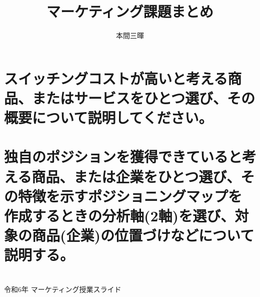 \documentclass[titlepage,a4paper]{jsarticle}
\title{マーケティング\ajRoman{2}課題まとめ}
\author{本間三暉}
\begin{document}
\maketitle
\section{スイッチングコストが高いと考える商品、またはサービスをひとつ選び、その概要について説明してください。}

\section{独自のポジションを獲得できていると考える商品、または企業をひとつ選び、その特徴を示すポジショニングマップを 作成するときの分析軸(2軸)を選び、対象の商品(企業)の位置づけなどについて説明する。}

\section{}
\begin{thebibliography}{99}
   令和6年 マーケティング授業スライド
  \bibitem{}
\end{thebibliography}
\end{document}
